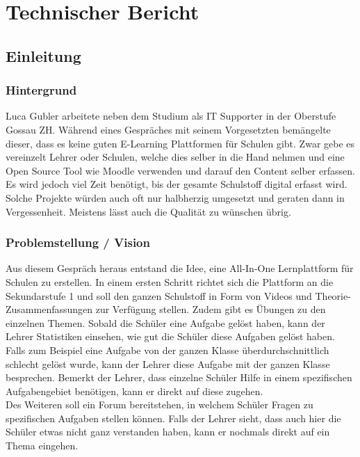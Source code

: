 \section{Technischer Bericht}
\subsection{Einleitung}

\subsubsection{Hintergrund}
Luca Gubler arbeitete neben dem Studium als IT Supporter in der Oberstufe Gossau ZH. Während eines Gespräches mit seinem Vorgesetzten bemängelte dieser, dass es keine guten E-Learning Plattformen für Schulen gibt. Zwar gebe es vereinzelt Lehrer oder Schulen, welche dies selber in die Hand nehmen und eine Open Source Tool wie Moodle verwenden und darauf den Content selber erfassen. Es wird jedoch viel Zeit benötigt, bis der gesamte Schulstoff digital erfasst wird. Solche Projekte würden auch oft nur halbherzig umgesetzt und geraten dann in Vergessenheit. Meistens lässt auch die Qualität zu wünschen übrig.

\subsubsection{Problemstellung / Vision}
Aus diesem Gespräch heraus entstand die Idee, eine All-In-One Lernplattform für Schulen zu erstellen. In einem ersten Schritt richtet sich die Plattform an die Sekundarstufe 1 und soll den ganzen Schulstoff in Form von Videos und Theorie-Zusammenfassungen zur Verfügung stellen. Zudem gibt es Übungen zu den einzelnen Themen. Sobald die Schüler eine Aufgabe gelöst haben, kann der Lehrer Statistiken einsehen, wie gut die Schüler diese Aufgaben gelöst haben. Falls zum Beispiel eine Aufgabe von der ganzen Klasse überdurchschnittlich schlecht gelöst wurde, kann der Lehrer diese Aufgabe mit der ganzen Klasse besprechen. Bemerkt der Lehrer, dass einzelne Schüler Hilfe in einem spezifischen Aufgabengebiet benötigen, kann er direkt auf diese zugehen.\\

Des Weiteren soll ein Forum bereitstehen, in welchem Schüler Fragen zu spezifischen Aufgaben stellen können. Falls der Lehrer sieht, dass auch hier die Schüler etwas nicht ganz verstanden haben, kann er nochmals direkt auf ein Thema eingehen. \\

